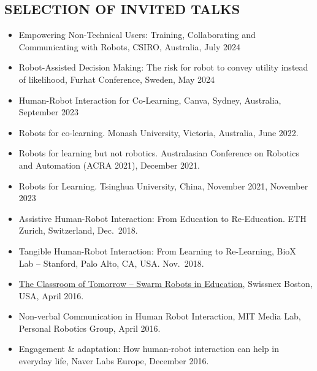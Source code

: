 
\subsection{SELECTION OF INVITED TALKS}
\vspace{2pt}

\begin{itemize}
    \item Empowering Non-Technical Users: Training, Collaborating and Communicating with Robots, CSIRO, Australia, July 2024
    \item Robot-Assisted Decision Making: The risk for robot to convey utility instead of likelihood, Furhat Conference, Sweden, May 2024
    \item Human-Robot Interaction for Co-Learning, Canva, Sydney, Australia, September 2023
    \item Robots for co-learning. Monash University, Victoria, Australia, June 2022.
    \item Robots for learning but not robotics. Australasian Conference on Robotics and Automation (ACRA 2021), December 2021.
    \item Robots for Learning. Tsinghua University, China, November 2021, November 2023
    \item Assistive Human-Robot Interaction: From Education to Re-Education. ETH Zurich, Switzerland, Dec.\ 2018.
    \item Tangible Human-Robot Interaction: From Learning to Re-Learning, BioX Lab -- Stanford, Palo Alto, CA, USA. Nov.\ 2018.
    \item \href{https://www.swissnexboston.org/event/the-classroom-of-tomorrow-swarm-robots-in-education/}{The Classroom of Tomorrow -- Swarm Robots in Education}, Swissnex Boston, USA, April 2016.
    \item Non-verbal Communication in Human Robot Interaction, MIT Media Lab, Personal Robotics Group, April 2016.
    \item Engagement \& adaptation: How human-robot interaction can help in everyday life, Naver Labs Europe, December 2016.
\end{itemize}


